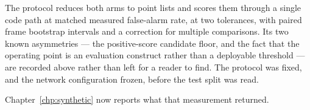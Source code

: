 The protocol reduces both arms to point lists and scores them through a single code path at matched
measured false-alarm rate, at two tolerances, with paired frame bootstrap intervals and a correction
for multiple comparisons. Its two known asymmetries --- the positive-score candidate floor, and the
fact that the operating point is an evaluation construct rather than a deployable threshold --- are
recorded above rather than left for a reader to find. The protocol was fixed, and the network
configuration frozen, before the test split was read.

Chapter~\ref{chp:synthetic} now reports what that measurement returned.
